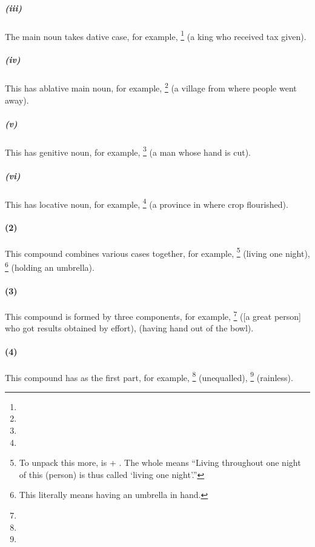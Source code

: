 \subparagraph*{(iii) } The main noun takes dative case, for example, \footnote{} (a king who received tax given).

\subparagraph*{(iv) } This has ablative main noun, for example, \footnote{} (a village from where people went away).

\subparagraph*{(v) } This has genitive noun, for example, \footnote{} (a man whose hand is cut).

\subparagraph*{(vi) } This has locative noun, for example, \footnote{} (a province in where crop flourished).

\paragraph*{(2) } This compound combines various cases together, for example, \footnote{ To unpack this more,  is  + . The whole means ``Living throughout one night of this (person) is thus called `living one night'.''} (living one night), \footnote{ This literally means having an umbrella in hand.} (holding an umbrella).

\paragraph*{(3) } This compound is formed by three components, for example, \footnote{} ([a great person] who got results obtained by effort),  (having hand out of the bowl).

\paragraph*{(4) } This compound has  as the first part, for example, \footnote{} (unequalled), \footnote{} (rainless).

